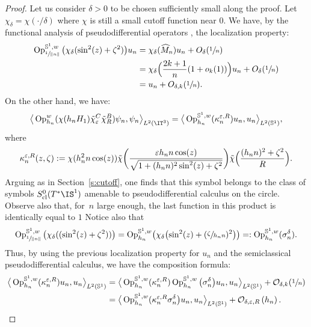\documentclass[JEP,XML,SOM,Unicode, NoEqCountersInSection,published]{cedram}
\theoremstyle{plain}
\theoremstyle{definition}
\theoremstyle{remark}
\newcommand{\Op}{\operatorname{Op}}
\begin{document}
\begin{proof}
Let us consider $\delta > 0$ to be chosen sufficiently small along the proof. Let $\chi_\delta = \chi(\cdot/\delta)$ where $\chi$ is still a small cutoff function near $0$. We have, by the functional analysis of pseudodifferential operators \cite[Th.\,14.9]{Zworski12}, the localization property:
\begin{align*}
\Op_{\sfrac{1}{\Vert n \Vert}}^{\mathbb{S}^1,w} \big(\chi_\delta(\sin^2(z) + \zeta^2) \big) u_n & = \chi_{\delta}(\widehat{M}_n) u_n + O_\delta(\sfrac{1}{n}) \\
& = \chi_\delta\Bigl(\frac{2k+1}{n}(1+o_k(1))\Bigr) u_n + O_\delta(\sfrac{1}{n}) \\
& = u_n + O_{\delta,k}(\sfrac{1}{n}).
\end{align*}
On the other hand, we have:
\[
\big \langle \Op_{h_n}^w(\chi(h_n H_1) \tilde{\chi}_\varepsilon^C \tilde{\chi}_R^B) \psi_n, \psi_n \big \rangle_{L^2(\IT^3)} = \big \langle \Op_{h_n}^{\mathbb{S}^1,w} (\kappa_n^{\varepsilon,R}) u_n,u_n \big \rangle_{L^2(\mathbb{S}^1)},
\]
where
\[
\kappa_n^{\varepsilon,R}(z,\zeta) := \chi(h_n^2 n \cos(z)) \tilde{\chi} \biggl(\frac{ \varepsilon h_n n \cos(z) }{\sqrt{1 + (h_n n)^2\sin^2(z) + \zeta^2}} \biggr) \tilde{\chi} \Bigl(\frac{ (h_n n)^2 + \zeta^2}{R} \Bigr).
\]
Arguing as in Section~\ref{s:cutoff}, one finds that this symbol belongs to the class of symbols $S^0_{\textup{cl}}(T^*\IS^1)$ amenable to pseudodifferential calculus on the circle. Observe also that, for~$n$ large enough, the last function in this product is identically equal to $1$ Notice also that
\[
\Op_{\sfrac{1}{\Vert n \Vert}}^{\mathbb{S}^1,w} \big(\chi_\delta((\sin^2(z) + \zeta^2)) \big) = \Op_{h_n}^{\mathbb{S}^1,w} \bigl(\chi_\delta\bigl(\sin^2(z) +(\sfrac{\zeta}{h_n n})^2 \bigr) \bigr) =: \Op_{h_n}^{\mathbb{S}^1,w} (\sigma_n^\delta).
\]
Thus, by using the previous localization property for $u_n$ and the semiclassical pseudodifferential calculus, we have the composition formula:
\begin{align*}
\big \langle \Op_{h_n}^{\mathbb{S}^1,w} (\kappa_n^{\varepsilon,R}) u_n,u_n \big \rangle_{L^2(\mathbb{S}^1)} & = \big \langle \Op_{h_n}^{\mathbb{S}^1,w} (\kappa_n^{\varepsilon,R}) \Op_{h_n}^{\mathbb{S}^1,w} \big(\sigma_n^\delta \big) u_n,u_n \big \rangle_{L^2(\mathbb{S}^1)} + \mathcal{O}_{\delta,k}(\sfrac{1}{n}) \\
& = \big \langle \Op_{h_n}^{\mathbb{S}^1,w} (\kappa_n^{\varepsilon,R} \sigma_n^\delta \big) u_n,u_n \big \rangle_{L^2(\mathbb{S}^1)} + \mathcal{O}_{\delta,\varepsilon,R}\left(h_n \right).

\end{align*}
\end{proof}
\end{document}
